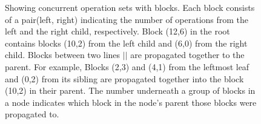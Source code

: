 \documentclass[10pt]{article}
\theoremstyle{definition}
\begin{document}
\pagebreak
\begin{figure}

\begin{center}
\end{center}
\caption{\label{fig:block} Showing concurrent operation sets with blocks. Each block consists of a pair(left, right) indicating the number of operations from the left and the right child, respectively. Block (12,6) in the root contains blocks (10,2) from the left child and (6,0) from the right child. Blocks between two lines $||$ are propagated together to the parent. For example, Blocks (2,3) and (4,1) from the leftmost leaf and (0,2) from its sibling are propagated together into the block (10,2) in their parent. The number underneath a group of blocks in a node indicates which block in the node's parent those blocks were propagated to.}
\end{figure}
\end{document}
